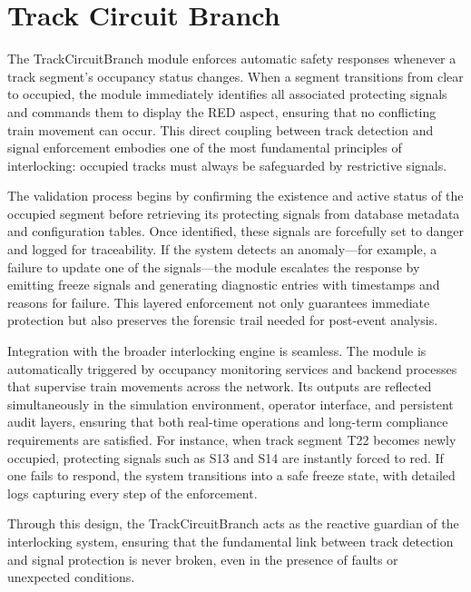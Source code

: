 \section{Track Circuit Branch}
\label{sec:methodology:track-circuit-branch}

The TrackCircuitBranch module enforces automatic safety responses whenever a track segment’s occupancy status changes. When a segment transitions from clear to occupied, the module immediately identifies all associated protecting signals and commands them to display the RED aspect, ensuring that no conflicting train movement can occur. This direct coupling between track detection and signal enforcement embodies one of the most fundamental principles of interlocking: occupied tracks must always be safeguarded by restrictive signals.

The validation process begins by confirming the existence and active status of the occupied segment before retrieving its protecting signals from database metadata and configuration tables. Once identified, these signals are forcefully set to danger and logged for traceability. If the system detects an anomaly—for example, a failure to update one of the signals—the module escalates the response by emitting freeze signals and generating diagnostic entries with timestamps and reasons for failure. This layered enforcement not only guarantees immediate protection but also preserves the forensic trail needed for post-event analysis.

Integration with the broader interlocking engine is seamless. The module is automatically triggered by occupancy monitoring services and backend processes that supervise train movements across the network. Its outputs are reflected simultaneously in the simulation environment, operator interface, and persistent audit layers, ensuring that both real-time operations and long-term compliance requirements are satisfied. For instance, when track segment T22 becomes newly occupied, protecting signals such as S13 and S14 are instantly forced to red. If one fails to respond, the system transitions into a safe freeze state, with detailed logs capturing every step of the enforcement.

Through this design, the TrackCircuitBranch acts as the reactive guardian of the interlocking system, ensuring that the fundamental link between track detection and signal protection is never broken, even in the presence of faults or unexpected conditions.